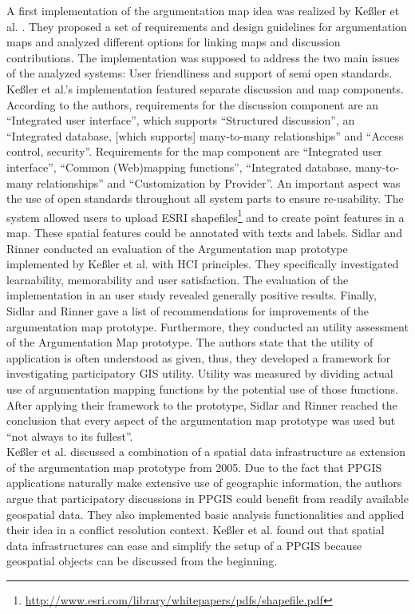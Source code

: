A first implementation of the argumentation map idea was realized by Ke{\ss}ler et al. \cite{Kessler2005_ArgumentationMapPrototype}. They proposed a set of requirements and design guidelines for argumentation maps and analyzed different options for linking maps and discussion contributions. The implementation was supposed to address the two main issues of the analyzed systems: User friendliness and support of semi open standards. Ke{\ss}ler et al.'s implementation featured separate discussion and map components. According to the authors, requirements for the discussion component are an ``Integrated user interface'', which supports ``Structured discussion'', an ``Integrated database, [which supports] many-to-many relationships'' and ``Access control, security''. Requirements for the map component are ``Integrated user interface'', ``Common (Web)mapping functions'', ``Integrated database, many-to-many relationships'' and ``Customization by Provider''. An important aspect was the use of open standards throughout all system parts to ensure re-usability. The system allowed users to upload ESRI shapefiles\footnote{\url{http://www.esri.com/library/whitepapers/pdfs/shapefile.pdf}} and to create point features in a map. These spatial features could be annotated with texts and labels. Sidlar and Rinner \cite{sidlar_argumap_2007} conducted an evaluation of the Argumentation map prototype implemented by Ke{\ss}ler et al. with HCI principles. They specifically investigated learnability, memorability and user satisfaction. The evaluation of the implementation in an user study revealed generally positive results. Finally, Sidlar and Rinner gave a list of recommendations for improvements of the argumentation map prototype. Furthermore, they conducted an utility assessment \cite{Sidlar2009-AssessmentMapGeocollaborationTool} of the Argumentation Map prototype. The authors state that the utility of application is often understood as given, thus, they developed a framework for investigating participatory GIS utility. Utility was measured by dividing actual use of argumentation mapping functions by the potential use of those functions. After applying their framework to the prototype, Sidlar and Rinner reached the conclusion that every aspect of the argumentation map prototype was used but ``not always to its fullest''. \\
Ke{\ss}ler et al. \cite{Kessler2005_Conflict_Resolution} discussed a combination of a spatial data infrastructure as extension of the argumentation map prototype from 2005. Due to the fact that PPGIS applications naturally make extensive use of geographic information, the authors argue that participatory discussions in PPGIS could benefit from readily available geospatial data. They also implemented basic analysis functionalities and applied their idea in a conflict resolution context. Ke{\ss}ler et al. found out that spatial data infrastructures can ease and simplify the setup of a PPGIS because geospatial objects can be discussed from the beginning.\\
